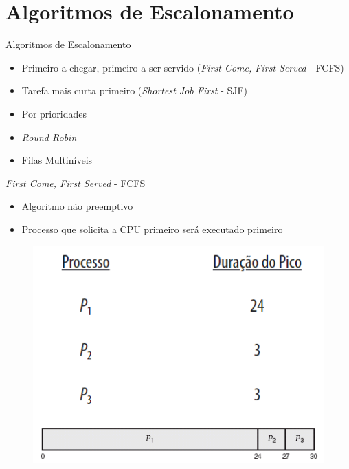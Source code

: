 \documentclass[aspectratio=169,
				xcolor=table]{beamer}
\begin{document}
	\section{Algoritmos de Escalonamento}
	\begin{frame}{Algoritmos de Escalonamento}
		\begin{itemize}
			\item Primeiro a chegar, primeiro a ser servido (\textit{First Come, First Served} - FCFS)
			\item Tarefa mais curta primeiro (\textit{Shortest Job First} - SJF)
			\item Por prioridades
			\item \textit{Round Robin}
			\item Filas Multiníveis
		\end{itemize}
	\end{frame}
	
	\begin{frame}{\textit{First Come, First Served} - FCFS}
		\begin{itemize}
			\item Algoritmo não preemptivo 
			\vspace{1em}
			\item Processo que solicita a CPU primeiro será executado primeiro			
		\end{itemize}
		\begin{figure}[hbtp]
		\centering
		\includegraphics[keepaspectratio, height=.6\textheight]{../figs/cap06/fcfs.png}
		\end{figure}				
	\end{frame}
	
\end{document}
